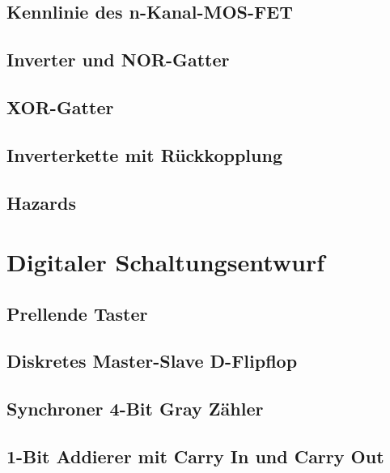 \documentclass[paper=a4, fontsize=11pt]{scrartcl}
\numberwithin{equation}{section}
\numberwithin{figure}{section}
\numberwithin{table}{section}
\begin{document}
\subsection{Kennlinie des n-Kanal-MOS-FET}

\subsection{Inverter und NOR-Gatter}

\subsection{XOR-Gatter}

\subsection{Inverterkette mit Rückkopplung}

\subsection{Hazards}


\newpage

\section{Digitaler Schaltungsentwurf}

\subsection{Prellende Taster}

\subsection{Diskretes Master-Slave D-Flipflop}

\subsection{Synchroner 4-Bit Gray Zähler}

\subsection{1-Bit Addierer mit Carry In und Carry Out}

\end{document}
